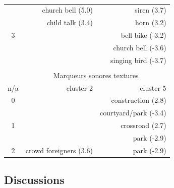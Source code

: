 \begin{table}[t]
\begin{tabular}{crr}
\hline
                      & church bell (5.0)  & siren (3.7)  \\
                      & child talk (3.4)   & horn (3.2) \\  
3                     &                    & bell bike (-3.2) \\  
                      &                    & church bell (-3.6) \\  
                      &                    & singing bird (-3.7) \\                                              
\hline                      
                      &                    &                   \\                       
                      & \multicolumn{2}{c}{Marqueurs sonores textures}  \\ 
n/a                   &      cluster   2        & cluster      5        \\                      
\hline
0                     &                         & construction (2.8)    \\
                      &                         & courtyard/park (-3.4) \\
\hline
1                     &                         & crossroad (2.7)           \\
                      &                         & park (-2.9)           \\
\hline
2                     & crowd foreigners (3.6)  & park (-2.9)           \\     
\hline
\end{tabular}
\vspace{0.5mm}
\caption{\label{tab:markerHac}  }
\end{table}
\subsection{Discussions}





